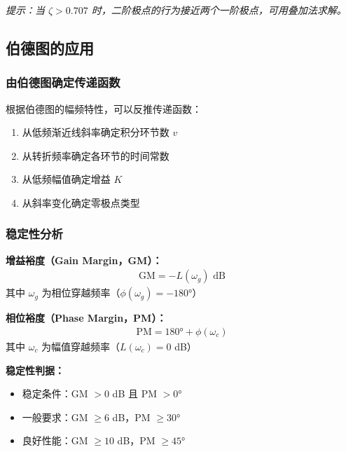 \vspace{0.3cm}
\textit{提示：当 $\zeta > 0.707$ 时，二阶极点的行为接近两个一阶极点，可用叠加法求解。}

\subsection{伯德图的应用}

\subsubsection{由伯德图确定传递函数}
根据伯德图的幅频特性，可以反推传递函数：
\begin{enumerate}
    \item 从低频渐近线斜率确定积分环节数 $v$
    \item 从转折频率确定各环节的时间常数
    \item 从低频幅值确定增益 $K$
    \item 从斜率变化确定零极点类型
\end{enumerate}

\subsubsection{稳定性分析}
\textbf{增益裕度（Gain Margin，GM）：}
\begin{align*}
\text{GM} = -L(\omega_g) \text{ dB}
\end{align*}
其中 $\omega_g$ 为相位穿越频率（$\phi(\omega_g) = -180°$）

\textbf{相位裕度（Phase Margin，PM）：}
\begin{align*}
\text{PM} = 180° + \phi(\omega_c)
\end{align*}
其中 $\omega_c$ 为幅值穿越频率（$L(\omega_c) = 0$ dB）

\textbf{稳定性判据：}
\begin{itemize}
    \item 稳定条件：GM $> 0$ dB 且 PM $> 0°$
    \item 一般要求：GM $\geq 6$ dB，PM $\geq 30°$
    \item 良好性能：GM $\geq 10$ dB，PM $\geq 45°$
\end{itemize}

